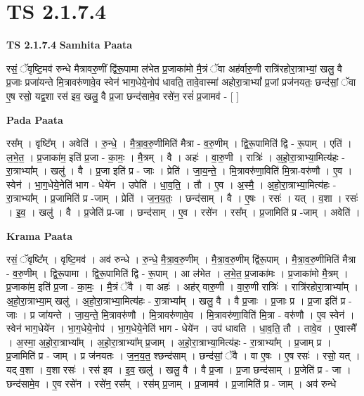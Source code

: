\documentclass[17pt]{extarticle}
\begin{document}
\section{ TS 2.1.7.4 }

\textbf{TS 2.1.7.4 } \newline
\textbf{Samhita Paata} \newline

रसं॒ ॅवृष्टि॒मव॑ रुन्धे मैत्रावरु॒णीं द्वि॑रू॒पामा ल॑भेत प्र॒जाका॑मो मै॒त्रं ॅवा अह॑र्वारु॒णी रात्रि॑रहोरा॒त्राभ्यां॒ खलु॒ वै प्र॒जाः प्रजा॑यन्ते मि॒त्रावरु॑णावे॒व स्वेन॑ भाग॒धेये॒नोप॑ धावति॒ तावे॒वास्मा॑ अहोरा॒त्राभ्यां᳚ प्र॒जां प्रज॑नयतः॒ छन्द॑सां॒ ॅवा ए॒ष रसो॒ यद्व॒शा रस॑ इव॒ खलु॒ वै प्र॒जा छन्द॑सामे॒व रसे॑न॒ रसं॑ प्र॒जामव॑ - [  ] \newline

\textbf{Pada Paata} \newline

रस᳚म् । वृष्टि᳚म् । अवेति॑ । रु॒न्धे॒ । मै॒त्रा॒व॒रु॒णीमिति॑ मैत्रा - व॒रु॒णीम् । द्वि॒रू॒पामिति॑ द्वि - रू॒पाम् । एति॑ । ल॒भे॒त॒ । प्र॒जाका॑म॒ इति॑ प्र॒जा - का॒मः॒ । मै॒त्रम् । वै । अहः॑ । वा॒रु॒णी । रात्रिः॑ । अ॒हो॒रा॒त्राभ्या॒मित्य॑हः - रा॒त्राभ्या᳚म् । खलु॑ । वै । प्र॒जा इति॑ प्र - जाः । प्रेति॑ । जा॒य॒न्ते॒ । मि॒त्रावरु॑णा॒विति॑ मि॒त्रा-वरु॑णौ । ए॒व । स्वेन॑ । भा॒ग॒धेये॒नेति॑ भाग - धेये॑न । उपेति॑ । धा॒व॒ति॒ । तौ । ए॒व । अ॒स्मै॒ । अ॒हो॒रा॒त्राभ्या॒मित्य॑हः - रा॒त्राभ्या᳚म् । प्र॒जामिति॑ प्र -जाम् । प्रेति॑ । ज॒न॒य॒तः॒ । छन्द॑साम् । वै । ए॒षः । रसः॑ । यत् । व॒शा । रसः॑ । इ॒व॒ । खलु॑ । वै । प्र॒जेति॑ प्र-जा । छन्द॑साम् । ए॒व । रसे॑न । रस᳚म् । प्र॒जामिति॑ प्र -जाम् । अवेति॑ ।  \newline


\textbf{Krama Paata} \newline

रसं॒ ॅवृष्टि᳚म् । वृष्टि॒मव॑ । अव॑ रुन्धे । रु॒न्धे॒ मै॒त्रा॒व॒रु॒णीम् । मै॒त्रा॒व॒रु॒णीम् द्वि॑रू॒पाम् । मै॒त्रा॒व॒रु॒णीमिति॑ मैत्रा - व॒रु॒णीम् । द्वि॒रू॒पामा । द्वि॒रू॒पामिति॑ द्वि - रू॒पाम् । आ ल॑भेत । ल॒भे॒त॒ प्र॒जाका॑मः । प्र॒जाका॑मो मै॒त्रम् । प्र॒जाका॑म॒ इति॑ प्र॒जा - का॒मः॒ । मै॒त्रं ॅवै । वा अहः॑ । अह॑र् वारु॒णी । वा॒रु॒णी रात्रिः॑ । 
रात्रि॑रहोरा॒त्राभ्या᳚म् । अ॒हो॒रा॒त्राभ्या॒म् खलु॑ । अ॒हो॒रा॒त्राभ्या॒मित्य॑हः - रा॒त्राभ्या᳚म् । खलु॒ वै । वै प्र॒जाः । प्र॒जाः प्र । प्र॒जा इति॑ प्र - जाः । प्र जा॑यन्ते । जा॒य॒न्ते॒ मि॒त्रावरु॑णौ । मि॒त्रावरु॑णावे॒व । मि॒त्रावरु॑णा॒विति॑ मि॒त्रा - वरु॑णौ । ए॒व स्वेन॑ । स्वेन॑ भाग॒धेये॑न । भा॒ग॒धेये॒नोप॑ । भा॒ग॒धेये॒नेति॑ भाग - धेये॑न । उप॑ धावति । धा॒व॒ति॒ तौ । तावे॒व । ए॒वास्मै᳚ । अ॒स्मा॒ अ॒हो॒रा॒त्राभ्या᳚म् । अ॒हो॒रा॒त्राभ्या᳚म् प्र॒जाम् । अ॒हो॒रा॒त्राभ्या॒मित्य॑हः - रा॒त्राभ्या᳚म् । प्र॒जाम् प्र । प्र॒जामिति॑ प्र - जाम् । प्र ज॑नयतः । ज॒न॒य॒त॒ श्छन्द॑साम् । छन्द॑सां॒ ॅवै । वा ए॒षः । ए॒ष रसः॑ । रसो॒ यत् । यद् व॒शा । व॒शा रसः॑ । रस॑ इव । इ॒व॒ खलु॑ । खलु॒ वै । वै प्र॒जा । प्र॒जा छन्द॑साम् । प्र॒जेति॑ प्र - जा । छन्द॑सामे॒व । ए॒व रसे॑न । रसे॑न॒ रस᳚म् । रस॑म् प्र॒जाम् । प्र॒जामव॑ । प्र॒जामिति॑ प्र - जाम् । अव॑ रुन्धे \newline
\end{document}
